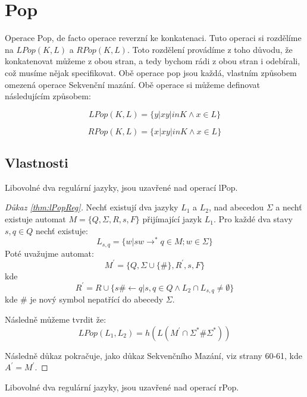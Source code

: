 \section{Pop}
Operace Pop, de facto operace reverzní ke konkatenaci. Tuto operaci si rozdělíme na $LPop(K,L)$ a $RPop(K,L)$. Toto rozdělení provádíme z toho důvodu, že konkatenovat můžeme z obou stran, a tedy bychom rádi z obou stran i odebírali, což musíme nějak specifikovat. Obě operace pop jsou každá, vlastním způsobem omezená operace Sekvenční mazání.
Obě operace si můžeme definovat následujícím způsobem:

\begin{equation}\label{eq:lPop}
	LPop(K,L) = \{y|xy |in K \land x \in L\}
\end{equation}


\begin{equation}\label{eq:rPop}
	RPop(K,L) = \{x|xy |in K \land x \in L\}
\end{equation}

\subsection{Vlastnosti}
\begin{theorem} \label{thm:lPopReg}
	Libovolné dva regulární jazyky, jsou uzavřené nad operací lPop.
\end{theorem}

\begin{proof}[Důkaz \ref{thm:lPopReg}]
	Nechť existují dva jazyky $L_{1}$ a $L_{2}$, nad abecedou $\Sigma$ a nechť existuje automat $M=\{Q,\Sigma,R,s,F\}$ přijímající jazyk $L_{1}$. Pro každé dva stavy $s,q \in Q$  nechť existuje:
	$$L_{s,q} = \{w|sw\longrightarrow^{*}q \in M; w\in \Sigma\}$$
	 Poté uvažujme automat:
	 $$M^{'}=\{Q,\Sigma\cup\{\#\},R^{'},s,F\}$$
	 kde $$R^{'} = R\cup\{s\#\longleftarrow q|s,q\in Q \land L_{2} \cap L_{s,q} \neq \emptyset\}$$
	 kde $\#$ je nový symbol nepatřící do abecedy $\Sigma$.
	 
	 Následně můžeme tvrdit že:
	 $$LPop(L_{1},L_{2}) = h(L(M^{'} \cap \Sigma^{*}\#\Sigma^{*}))$$
	 
	 Následně důkaz pokračuje, jako důkaz Sekvenčního Mazání, viz \cite{lilaKari} strany 60-61, kde $A^{'}=M^{'}$.
\end{proof}

\begin{theorem} \label{thm:rPopReg}
	Libovolné dva regulární jazyky, jsou uzavřené nad operací rPop.
\end{theorem}

